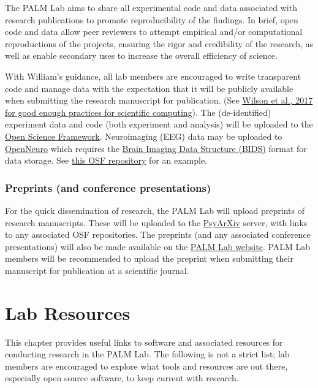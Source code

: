 \documentclass[
]{book}
\begin{document}
The PALM Lab aims to share all experimental code and data associated with research publications to promote reproducibility of the findings. In brief, open code and data allow peer reviewers to attempt empirical and/or computational reproductions of the projects, ensuring the rigor and credibility of the research, as well as enable secondary uses to increase the overall efficiency of science.

With William's guidance, all lab members are encouraged to write transparent code and manage data with the expectation that it will be publicly available when submitting the research manuscript for publication. (See \href{https://journals.plos.org/ploscompbiol/article?id=10.1371/journal.pcbi.1005510}{Wilson et al., 2017 for good enough practices for scientific computing}). The (de-identified) experiment data and code (both experiment and analysis) will be uploaded to the \href{https://osf.io}{Open Science Framework}. Neuroimaging (EEG) data may be uploaded to \href{https://openneuro.org/}{OpenNeuro} which requires the \href{https://bids.neuroimaging.io/}{Brain Imaging Data Structure (BIDS)} format for data storage. See \href{https://osf.io/wjr7u/}{this OSF repository} for an example.

\hypertarget{preprints-and-conference-presentations}{%
\subsection{Preprints (and conference presentations)}\label{preprints-and-conference-presentations}}

For the quick dissemination of research, the PALM Lab will upload preprints of research manuscripts. These will be uploaded to the \href{https://psyarxiv.com}{PsyArXiv} server, with links to any associated OSF repositories. The preprints (and any associated conference presentations) will also be made available on the \href{https://palm-lab.github.io/presentations}{PALM Lab website}. PALM Lab members will be recommended to upload the preprint when submitting their manuscript for publication at a scientific journal.

\hypertarget{lab-resources}{%
\chapter{Lab Resources}\label{lab-resources}}

This chapter provides useful links to software and associated resources for conducting research in the PALM Lab. The following is not a strict list; lab members are encouraged to explore what tools and resources are out there, especially open source software, to keep current with research.
\end{document}
